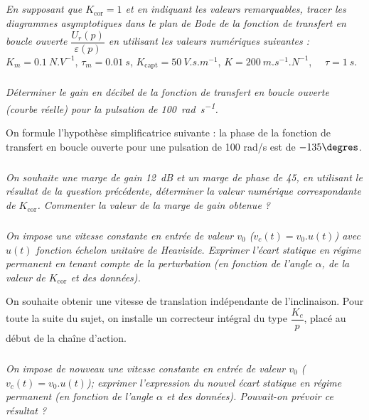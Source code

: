 \documentclass[10pt,fleqn]{article} %
\begin{document}
\begin{multicols}{2}
\subparagraph{}
\textit{En supposant que $K_{\text{cor}}= 1$ et en indiquant les valeurs remarquables, tracer les diagrammes asymptotiques dans le plan de Bode de la fonction de transfert en boucle ouverte $\dfrac{U_r (p)}{\varepsilon(p)}$ en utilisant les valeurs numériques suivantes :}
$K_m = \SI{0.1}{N.V^{-1}}$, $\tau_m= \SI{0,01}{s}$, $K_{\text{capt}} = \SI{50}{V.s.m^{-1}}$, 
$K = \SI{200}{m.s^{-1}.N^{-1}}$, $\quad \tau = \SI{1}{s}$.

\ifprof
\begin{corrige}
\end{corrige}
\else
\fi


\subparagraph{}
\textit{Déterminer le gain en décibel de la fonction de transfert en boucle ouverte (courbe réelle) pour la pulsation de \SI{100}{rad.s^{-1}}.}
\ifprof
\begin{corrige}
\end{corrige}
\else
\fi


On formule l’hypothèse simplificatrice suivante : la phase de la fonction de transfert en boucle ouverte pour une pulsation de 100 rad/s est de $-135\degres$.


\subparagraph{}
\textit{On souhaite une marge de gain \SI{12}{dB} et un marge de phase de 45\degres, en utilisant le résultat de la question précédente, déterminer la valeur numérique correspondante de $K_{\text{cor}}$.
Commenter la valeur de la marge de gain obtenue ?}
\ifprof
\begin{corrige}
\end{corrige}
\else
\fi


\subparagraph{}
\textit{On impose une vitesse constante en entrée de valeur $v_0$ ($v_c(t)=v_0.u(t)$) avec $u(t)$ fonction échelon unitaire de Heaviside. Exprimer l’écart statique en régime permanent en tenant compte de la perturbation (en fonction de l’angle $\alpha$, de la valeur de $K_{\text{cor}}$ et des données).}
\ifprof
\begin{corrige}
\end{corrige}
\else
\fi

\vspace{.25cm}

On souhaite obtenir une vitesse de translation indépendante de l’inclinaison. Pour toute la suite du sujet, on installe un correcteur intégral du type $\dfrac{K_c}{p}$, placé au début de la chaîne d’action.

\subparagraph{}
\textit{On impose de nouveau une vitesse constante en entrée de valeur $v_0$ ($v_c(t)=v_0.u(t)$); exprimer l’expression du nouvel écart statique en régime permanent (en fonction de l’angle $\alpha$ et des données). Pouvait-on prévoir ce résultat ?}
\ifprof
\begin{corrige}
\end{corrige}
\else
\fi

\end{multicols}
%
%
%
%
\end{document}
